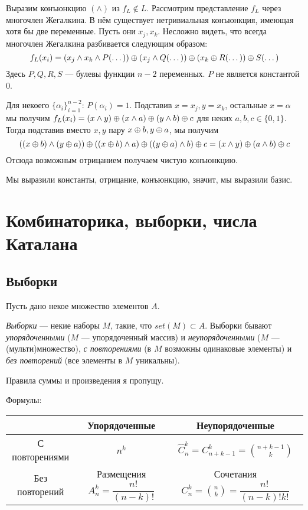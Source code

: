 \documentclass[a4paper]{report}
\begin{document}
{{{                \item Выразим конъюнкцию $(\land)$ из $f_L \notin L$.
                Рассмотрим представление $f_L$ через многочлен Жегалкина.
                В нём существует нетривиальная конъюнкция, имеющая хотя бы две переменные.
                Пусть они $x_j, x_k$.
                Несложно видеть, что всегда многочлен Жегалкина разбивается следующим образом: \[f_L(x_i) = \left(x_j \land x_k \land P(\dots)\right) \oplus \left(x_j \land Q(\dots)\right) \oplus \left(x_k \oplus R(\dots)\right) \oplus S(\dots)\] Здесь $P, Q, R, S$ --- булевы функции $n - 2$ переменных. $P$ не является константой $0$.

                Для некоего $\{\alpha_i\}_{i = 1}^{n-2}$: $P(\alpha_i) = 1$.
                Подставив $x = x_j, y = x_k$, остальные $x = \alpha$ мы получим $f_L(x_i) = (x \land y) \oplus (x \land a) \oplus (y \land b) \oplus c$ для неких $a, b, c \in \{0, 1\}$.
                Тогда подставив вместо $x, y$ пару $x \oplus b, y \oplus a$, мы получим \[\left((x \oplus b) \land (y \oplus a)\right) \oplus \left((x \oplus b) \land a\right) \oplus \left((y \oplus a) \land b\right) \oplus c = (x \land y) \oplus (a \land b) \oplus c\] Отсюда возможным отрицанием получаем чистую конъюнкцию.

            }
            Мы выразили константы, отрицание, конъюнкцию, значит, мы выразили базис.
        }
    }


    \chapter{Комбинаторика, выборки, числа Каталана}


    \section{Выборки}

    Пусть дано некое множество элементов $A$.

    \emph{Выборки} --- некие наборы $M$, такие, что $set(M) \subset A$.
    Выборки бывают \emph{упорядоченными} ($M$ --- упорядоченный массив) и \emph{неупорядоченными} ($M$ --- (мульти)множество), \emph{с повторениями} (в $M$ возможны одинаковые элементы) и \emph{без повторений} (все элементы в $M$ уникальны).

    Правила суммы и произведения я пропущу.

    Формулы:

    \begin{tabular}{| c | c | c |}
        \hline
        & Упорядоченные                           & Неупорядоченные                                         \\
        \hline
        С повторениями & $n^k$                                   & $\hat{C}_n^{k} = C_{n + k - 1}^{k} = \binom{n+k-1}{k}$  \\
        \hline
        Без повторений & Размещения $A_n^k = \dfrac{n!}{(n-k)!}$ & Сочетания $C_n^k = \binom{n}{k} = \dfrac{n!}{(n-k)!k!}$ \\
        \hline
    \end{tabular}
\end{document}
